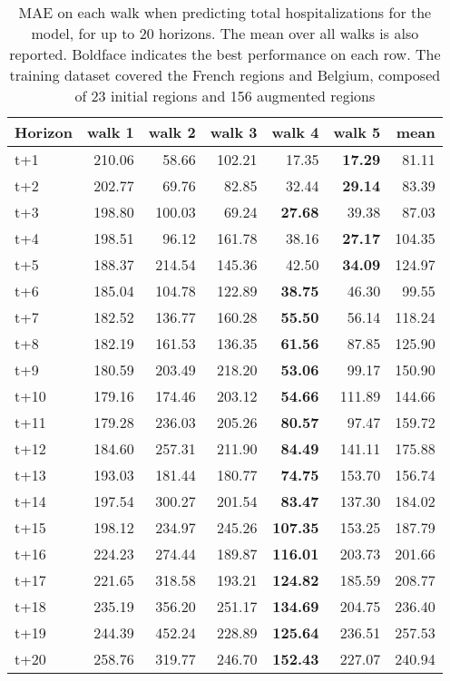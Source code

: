 \begin{table}[H]
\centering
\caption{MAE on each walk when predicting total hospitalizations for the model, for up to 20 horizons. The mean over all walks is also reported. Boldface indicates the best performance on each row. The training dataset covered the French regions and Belgium, composed of 23 initial regions and 156 augmented regions }
\label{tab:MAE_walk_dense_model}
\begin{tabular}{lrrrrrr}
\toprule
Horizon &  walk 1 &  walk 2 &  walk 3 &  walk 4 &  walk 5 &   mean \\
\midrule
t+1  & 210.06  & 58.66  & 102.21  & 17.35  & \textbf{17.29}  & 81.11  \\
t+2  & 202.77  & 69.76  & 82.85  & 32.44  & \textbf{29.14}  & 83.39  \\
t+3  & 198.80  & 100.03  & 69.24  & \textbf{27.68}  & 39.38  & 87.03  \\
t+4  & 198.51  & 96.12  & 161.78  & 38.16  & \textbf{27.17}  & 104.35  \\
t+5  & 188.37  & 214.54  & 145.36  & 42.50  & \textbf{34.09}  & 124.97  \\
t+6  & 185.04  & 104.78  & 122.89  & \textbf{38.75}  & 46.30  & 99.55  \\
t+7  & 182.52  & 136.77  & 160.28  & \textbf{55.50}  & 56.14  & 118.24  \\
t+8  & 182.19  & 161.53  & 136.35  & \textbf{61.56}  & 87.85  & 125.90  \\
t+9  & 180.59  & 203.49  & 218.20  & \textbf{53.06}  & 99.17  & 150.90  \\
t+10  & 179.16  & 174.46  & 203.12  & \textbf{54.66}  & 111.89  & 144.66  \\
t+11  & 179.28  & 236.03  & 205.26  & \textbf{80.57}  & 97.47  & 159.72  \\
t+12  & 184.60  & 257.31  & 211.90  & \textbf{84.49}  & 141.11  & 175.88  \\
t+13  & 193.03  & 181.44  & 180.77  & \textbf{74.75}  & 153.70  & 156.74  \\
t+14  & 197.54  & 300.27  & 201.54  & \textbf{83.47}  & 137.30  & 184.02  \\
t+15  & 198.12  & 234.97  & 245.26  & \textbf{107.35}  & 153.25  & 187.79  \\
t+16  & 224.23  & 274.44  & 189.87  & \textbf{116.01}  & 203.73  & 201.66  \\
t+17  & 221.65  & 318.58  & 193.21  & \textbf{124.82}  & 185.59  & 208.77  \\
t+18  & 235.19  & 356.20  & 251.17  & \textbf{134.69}  & 204.75  & 236.40  \\
t+19  & 244.39  & 452.24  & 228.89  & \textbf{125.64}  & 236.51  & 257.53  \\
t+20  & 258.76  & 319.77  & 246.70  & \textbf{152.43}  & 227.07  & 240.94  \\

\bottomrule
\end{tabular}
\end{table}
